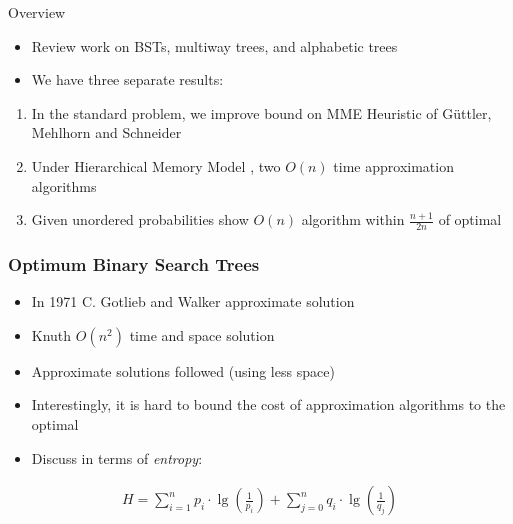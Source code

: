 \documentclass{beamer}
\theoremstyle{plain}
\begin{document}
\begin{frame}{Overview}

\begin{itemize}

\item Review work on BSTs, multiway trees, and alphabetic trees

\item We have three separate results:
\end{itemize}

\begin{enumerate}
\item In the standard problem, we improve bound on MME Heuristic of G{\"u}ttler, Mehlhorn and Schneider \cite{guttler1980binary}

\item Under Hierarchical Memory Model \cite{aggarwal1987model}, two $O(n)$ time approximation algorithms

\item Given unordered probabilities show $O(n)$ algorithm within $\frac{n+1}{2n}$ of optimal
\end{enumerate}




\end{frame}

\begin{frame} \frametitle{Optimum Binary Search Trees}

\begin{itemize}
\item In 1971 C. Gotlieb and Walker approximate solution \cite{walker1971top}

\item Knuth $O(n^2)$ time and space solution \cite{knuth1971optimum}

\item Approximate solutions followed (using less space)

\item Interestingly, it is hard to bound the cost of approximation algorithms to the optimal

\item Discuss in terms of \textit{entropy}:
\end{itemize}

\begin{align*}
H = \sum_{i=1}^{n} p_i\cdot\lg(\frac{1}{p_i}) + \sum_{j=0}^{n} q_i\cdot\lg(\frac{1}{q_j})
\end{align*}

\end{frame}
\end{document}
